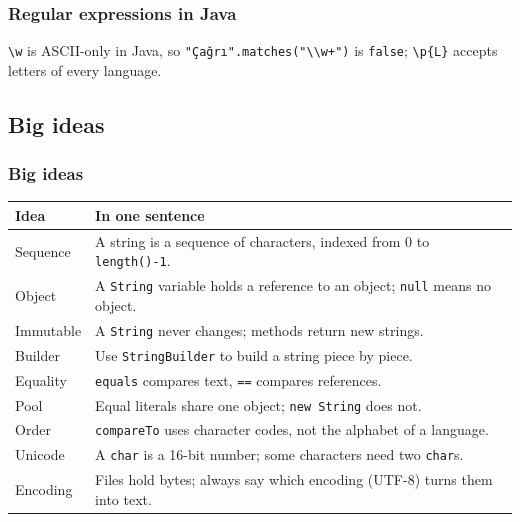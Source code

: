 \documentclass[aspectratio=169,10pt,compress]{beamer}
\begin{document}




\begin{frame}[t,fragile] \frametitle{Regular expressions in Java}

  \vspace{0.2em}
  \small \texttt{\textbackslash w} is ASCII-only in Java, so \texttt{"Çağrı".matches("\textbackslash\textbackslash w+")} is \texttt{false};
  \texttt{\textbackslash p\{L\}} accepts letters of every language.
\end{frame}





\subsection[Ideas]{Big ideas}




\begin{frame}[t,fragile] \frametitle{Big ideas}
  \small
  \begin{tabular}{@{}L{0.25\textwidth}L{0.68\textwidth}@{}}
    \toprule
    \textbf{Idea} & \textbf{In one sentence} \\
    \midrule
    Sequence         & A string is a sequence of characters, indexed from 0 to \texttt{length()-1}. \\
    Object           & A \texttt{String} variable holds a reference to an object; \texttt{null} means no object. \\
    Immutable        & A \texttt{String} never changes; methods return new strings. \\
    Builder          & Use \texttt{StringBuilder} to build a string piece by piece. \\
    Equality         & \texttt{equals} compares text, \texttt{==} compares references. \\
    Pool             & Equal literals share one object; \texttt{new String} does not. \\
    Order            & \texttt{compareTo} uses character codes, not the alphabet of a language. \\
    Unicode          & A \texttt{char} is a 16-bit number; some characters need two \texttt{char}s. \\
    Encoding         & Files hold bytes; always say which encoding (UTF-8) turns them into text. \\
    \bottomrule
  \end{tabular}
\end{frame}
\end{document}
